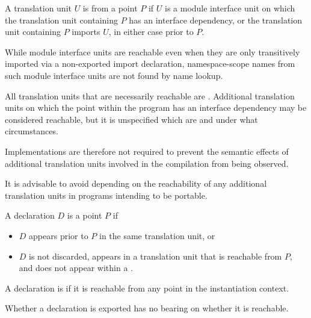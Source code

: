 \pnum
A translation unit $U$ is
from a point $P$ if
$U$ is a module interface unit on which the translation unit containing $P$
has an interface dependency, or
the translation unit containing $P$ imports $U$,
in either case prior to $P$.
\begin{note}
While module interface units are reachable even when they are only
transitively imported via a non-exported import declaration,
namespace-scope names from such module interface units are not found by
name lookup.
\end{note}

\pnum
All translation units that are necessarily reachable are
.
Additional translation units on which the
point within the program has an interface dependency may be considered reachable,
but it is unspecified which are and under what circumstances.
\begin{footnote}
Implementations are therefore not required to prevent the semantic
effects of additional translation units involved in the compilation from being
observed.
\end{footnote}
\begin{note}
It is advisable to avoid
depending on the reachability of any additional translation units
in programs intending to be portable.
\end{note}

\pnum
A declaration $D$ is
 a point $P$ if
\begin{itemize}
\item $D$ appears prior to $P$ in the same translation unit, or
\item $D$ is not discarded,
appears in a translation unit that is
reachable from $P$,
and
does not appear within a .
\end{itemize}
A declaration is 
if it is reachable from
any point in the instantiation context.
\begin{note}
Whether a declaration is exported has no bearing on whether it is reachable.
\end{note}

